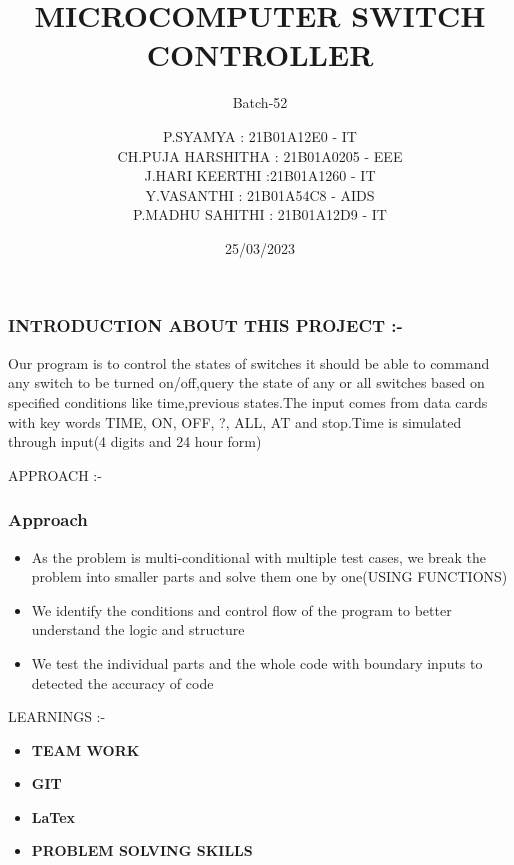 \documentclass[15pt]{beamer}
\title{MICROCOMPUTER SWITCH CONTROLLER  }
\subtitle{Batch-52 }
\author{
P.SYAMYA          : 21B01A12E0 -   IT\\
CH.PUJA HARSHITHA : 21B01A0205 - EEE\\
J.HARI KEERTHI    :21B01A1260   -    IT\\
Y.VASANTHI   : 21B01A54C8 -     AIDS\\
P.MADHU SAHITHI : 21B01A12D9 -  IT\\ }
\institute{\textbf{SVECW}}
\date{25/03/2023 }
\begin{document}
    \begin{frame}
        \titlepage
    \end{frame}
    \begin{frame}
	\frametitle{INTRODUCTION ABOUT THIS PROJECT :- }
 Our program is to control the states of switches it
should be able to command any switch to be
turned on/off,query the state of any or all switches
based on specified conditions like time,previous
states.The input comes from data cards with key words
TIME, ON, OFF, ?, ALL, AT and stop.Time is simulated
through input(4 digits and 24 hour form)
    \end{frame}
    
   
   
\begin{frame}{APPROACH :-}
	\frametitle{Approach}
	\begin{itemize}
 \item {As the problem is multi-conditional with multiple test cases, we break the problem into smaller parts and solve them one by one(USING FUNCTIONS)}
\item {We identify the conditions and control flow of the program to better understand the logic and structure
}
\item {We test the individual parts and the whole code with boundary inputs to detected the accuracy of code}
	
	\end{itemize}
    \end{frame}
    
\begin{frame}{LEARNINGS :-}
\begin{itemize}
    \item \textbf{TEAM WORK}
   \item\textbf{GIT}
   \item\textbf{LaTex}
    \item\textbf{PROBLEM SOLVING SKILLS}
\end{itemize}
    
\end{frame}
\end{document}
